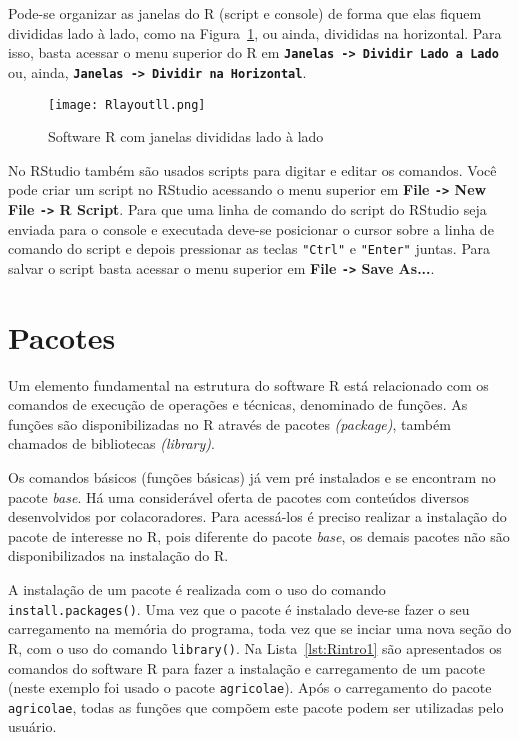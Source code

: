 \documentclass[11pt,fleqn]{book} %
\begin{document}
Pode-se organizar as janelas do R (script e console) de forma que elas fiquem divididas lado à lado, como na Figura~\ref{fig:Rlayoutll}, ou ainda, divididas na horizontal. Para isso, basta acessar o menu superior do R em {\bf \texttt{Janelas -> Dividir Lado a Lado}} ou, ainda, {\bf \texttt{Janelas -> Dividir na Horizontal}}.

\begin{figure}[h]
\centering\texttt{[image: Rlayoutll.png]}
\setlength{\abovecaptionskip}{0.5pt}
\caption{Software R com janelas divididas lado à lado}
\label{fig:Rlayoutll} %
\end{figure}

No RStudio também são usados scripts para digitar e editar os comandos. Você pode criar um script no RStudio acessando o menu superior em {\bf File \texttt{->} New File \texttt{->} R Script}. Para que uma linha de comando do script do RStudio seja enviada para o console e executada deve-se posicionar o cursor sobre a linha de comando do script e depois pressionar as teclas \texttt{"Ctrl"} e \texttt{"Enter"} juntas. Para salvar o script basta acessar o menu superior em {\bf File \texttt{->} Save As...}.


\section{Pacotes}

Um elemento fundamental na estrutura do software R está relacionado com os comandos de execução de operações e técnicas, denominado de funções. As funções são disponibilizadas no R através de pacotes  {\itshape (package)}, também chamados de bibliotecas  {\itshape (library)}.

Os comandos básicos (funções básicas) já vem pré instalados e se encontram no pacote  {\itshape base}. Há uma considerável oferta de pacotes com conteúdos diversos desenvolvidos por colacoradores. Para acessá-los é preciso realizar a instalação do pacote de interesse no R, pois diferente do pacote  {\itshape base}, os demais pacotes não são disponibilizados na instalação do R.

A instalação de um pacote é realizada com o uso do comando \texttt{install.packages()}. Uma vez que o pacote é instalado deve-se fazer o seu carregamento na memória do programa, toda vez que se inciar uma nova seção do R, com o uso do comando \texttt{library()}. Na Lista~\ref{lst:Rintro1} são apresentados os comandos do software R para fazer a instalação e carregamento de um pacote (neste exemplo foi usado o pacote \texttt{agricolae}). Após o carregamento do pacote \texttt{agricolae}, todas as funções que compõem este pacote podem ser utilizadas pelo usuário. \\
\end{document}
